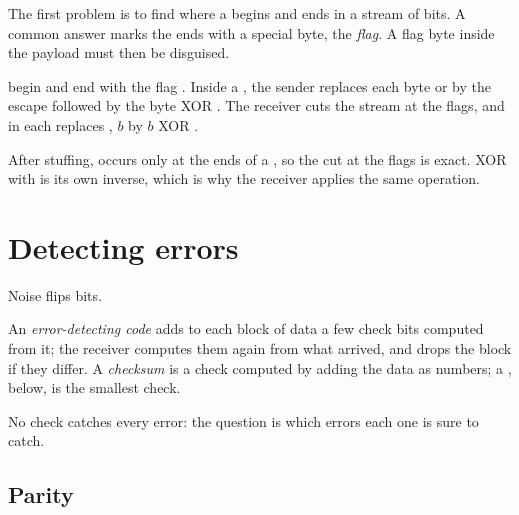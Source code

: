 The first problem is to find where a  begins and ends in a stream of bits. A common answer marks the ends with a
special byte, the \emph{flag}. A flag byte inside the payload must then be disguised.

\begin{method}\label{met:b2:link-layer:stuffing}
 begin and end with the flag . Inside a , the sender replaces each byte  or
 by the escape  followed by the byte XOR . The receiver cuts the stream at the
flags, and in each  replaces , $b$ by $b$ XOR .
\end{method}



After stuffing,  occurs only at the ends of a , so the cut at the flags is exact. XOR with
 is its own inverse, which is why the receiver applies the same operation.

\section{Detecting errors}\label{sec:b2:link-layer:errors}

Noise flips bits.

\begin{definition}\label{def:b2:link-layer:edc}
An \emph{error-detecting code} adds to each block of data a few check bits computed from
it; the receiver computes them again from what arrived, and drops the block if they differ. A \emph{checksum}
 is a check computed by adding the data as numbers; a , below, is the smallest check.
\end{definition}

No check catches every error: the question is which errors each one is sure to catch.

\subsection{Parity}

